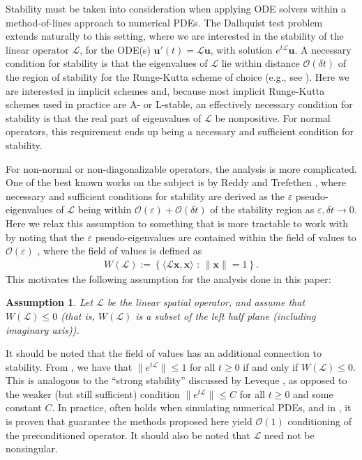\documentclass[a4paper,10pt]{article}
\newtheorem{assumption}{Assumption}
\begin{document}
Stability must be taken into consideration when applying ODE solvers within a
method-of-lines approach to numerical PDEs. The Dalhquist test problem extends
naturally to this setting, where we are interested in the stability of the
linear operator $\mathcal{L}$, for the ODE(s)
$\mathbf{u}'(t) = \mathcal{L}\mathbf{u}$, with solution $e^{t\mathcal{L}}\mathbf{u}$.
A necessary condition for stability is that the eigenvalues of $\mathcal{L}$
lie within distance $\mathcal{O}(\delta t)$ of the region of stability for
the Runge-Kutta scheme of choice (e.g., see \cite{reddy92}). Here we are
interested in implicit schemes and, because most implicit Runge-Kutta schemes
used in practice are A- or L-stable, an effectively necessary condition for
stability is that the real part of eigenvalues of $\mathcal{L}$ be nonpositive.
For normal operators, this requirement ends up being a necessary and sufficient
condition for stability.

For non-normal or non-diagonalizable operators, the analysis is more complicated.
One of the best known works on the subject is by Reddy and Trefethen \cite{reddy92},
where necessary and sufficient conditions for stability are derived as the
$\varepsilon$ pseudo-eigenvalues of $\mathcal{L}$ being within
$\mathcal{O}(\varepsilon) + \mathcal{O}(\delta t)$ of the stability region
as $\varepsilon,\delta t\to 0$. Here we relax this assumption to something
that is more tractable to work with by noting that the $\varepsilon$
pseudo-eigenvalues are contained within the field of values to
$\mathcal{O}(\varepsilon)$ \cite[Eq. (17.9)]{trefethen2005spectra},
where the field of values is defined as
%
\begin{align}\label{eq:fov}
W(\mathcal{L}) := \left\{ \langle \mathcal{L}\mathbf{x},\mathbf{x}\rangle \text{ : }
	\|\mathbf{x}\| = 1 \right\}.
\end{align}
%
This motivates the following assumption for the analysis done in this paper:
%
\begin{assumption} \label{ass:fov}
Let $\mathcal{L}$ be the linear spatial operator, and assume that $W(\mathcal{L}) \leq 0$
(that is, $W(\mathcal{L})$ is a subset of the left half plane (including imaginary axis)).
\end{assumption}
%
It should be noted that the field of values has an additional connection
to stability. From \cite[Theorem 17.1]{trefethen2005spectra}, we have that
$\|e^{t\mathcal{L}}\|\leq 1$ for all $t\geq 0$ if and only if $W(\mathcal{L}) \leq 0$.
This is analogous to the ``strong stability'' discussed by Leveque
\cite[Chapter 9.5]{leveque2007finite}, as opposed to the weaker (but still
sufficient) condition $\|e^{t\mathcal{L}}\|\leq C$ for all $t\geq 0$ and
some constant $C$. In practice,  often holds when
simulating numerical PDEs, and in , it is proven that
 guarantee the methods proposed here yield
$\mathcal{O}(1)$ conditioning of the preconditioned operator. It should
also be noted that $\mathcal{L}$ need not be nonsingular.
\end{document}
